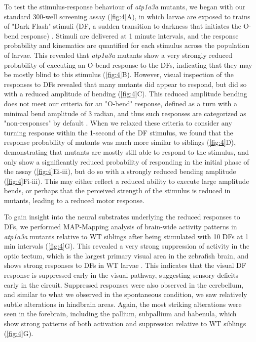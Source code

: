 \documentclass[9.5pt,lineno]{RandlettLab_elife}
\begin{document}
To test the stimulus-response behaviour of \emph{atp1a3a} mutants, we began with our standard 300-well screening assay (\autoref{fig:4}A), in which larvae are exposed to trains of "Dark Flash" stimuli (DF, a sudden transition to darkness that initiates the O-bend response) \citep{Randlett2019-fj,Lamire2023-he}. 
Stimuli are delivered at 1 minute intervals, and the response probability and kinematics are quantified for each stimulus across the population of larvae.
This revealed that \emph{atp1a3a} mutants show a very strongly reduced probability of executing an O-bend response to the DFs, indicating that they may be mostly blind to this stimulus (\autoref{fig:4}B). 
However, visual inspection of the responses to DFs revealed that many mutants did appear to respond, but did so with a reduced amplitude of bending (\autoref{fig:4}C). 
This reduced amplitude bending does not meet our criteria for an "O-bend" response, defined as a turn with a minimal bend amplitude of 3 radian, and thus such responses are categorized as "non-responses" by default \citep{Randlett2019-fj}.
When we relaxed these criteria to consider any turning response within the 1-second of the DF stimulus, we found that the response probability of mutants was much more similar to siblings (\autoref{fig:4}D), demonstrating that mutants are mostly still able to respond to the stimulus, and only show a significantly reduced probability of responding in the initial phase of the assay (\autoref{fig:4}Ei-iii), but do so with a strongly reduced bending amplitude (\autoref{fig:4}Fi-iii).
This may either reflect a reduced ability to execute large amplitude bends, or perhaps that the perceived strength of the stimulus is reduced in mutants, leading to a reduced motor response.


To gain insight into the neural substrates underlying the reduced responses to DFs, we performed MAP-Mapping analysis of brain-wide activity patterns in \emph{atp1a3a} mutants relative to WT siblings after being stimulated with 10 DFs at 1 min intervals (\autoref{fig:4}G).
This revealed a very strong suppression of activity in the optic tectum, which is the largest primary visual area in the zebrafish brain, and shows strong responses to DFs in WT larvae \citep{Lamire2023-he}. This indicates that the visual DF response is suppressed early in the visual pathway, suggesting sensory deficits early in the circuit. 
Suppressed responses were also observed in the cerebellum, and similar to what we observed in the spontaneous condition, we saw relatively subtle alterations in hindbrain areas. Again, the most striking alterations were seen in the forebrain, including the pallium, subpallium and habenula, which show strong patterns of both activation and suppression relative to WT siblings (\autoref{fig:4}G).
\end{document}
